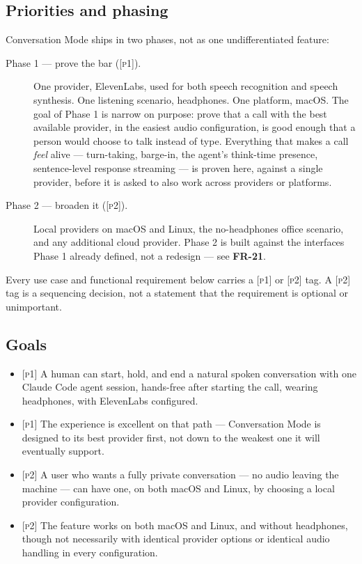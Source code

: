 \documentclass[a4paper,11pt]{report}
\newcommand{\fr}[1]{\textbf{FR-#1}}
\newcommand{\pone}{\textsc{[p1]}}
\newcommand{\ptwo}{\textsc{[p2]}}
\begin{document}
\subsection{Priorities and phasing}

Conversation Mode ships in two phases, not as one undifferentiated feature:

\begin{description}
  \item[Phase 1 --- prove the bar (\pone).] One provider, ElevenLabs, used
    for both speech recognition and speech synthesis. One listening
    scenario, headphones. One platform, macOS. The goal of Phase 1 is
    narrow on purpose: prove that a call with the best available provider,
    in the easiest audio configuration, is good enough that a person would
    choose to talk instead of type. Everything that makes a call
    \emph{feel} alive --- turn-taking, barge-in, the agent's think-time
    presence, sentence-level response streaming --- is proven here, against
    a single provider, before it is asked to also work across providers or
    platforms.
  \item[Phase 2 --- broaden it (\ptwo).] Local providers on macOS and
    Linux, the no-headphones office scenario, and any additional cloud
    provider. Phase 2 is built against the interfaces Phase 1 already
    defined, not a redesign --- see \fr{21}.
\end{description}

Every use case and functional requirement below carries a \pone{} or
\ptwo{} tag. A \ptwo{} tag is a sequencing decision, not a statement that
the requirement is optional or unimportant.

\subsection{Goals}

\begin{itemize}
  \item \pone{} A human can start, hold, and end a natural spoken
    conversation with one Claude Code agent session, hands-free after
    starting the call, wearing headphones, with ElevenLabs configured.
  \item \pone{} The experience is excellent on that path --- Conversation
    Mode is designed to its best provider first, not down to the weakest
    one it will eventually support.
  \item \ptwo{} A user who wants a fully private conversation --- no audio
    leaving the machine --- can have one, on both macOS and Linux, by
    choosing a local provider configuration.
  \item \ptwo{} The feature works on both macOS and Linux, and without
    headphones, though not necessarily with identical provider options or
    identical audio handling in every configuration.
\end{itemize}
\end{document}
